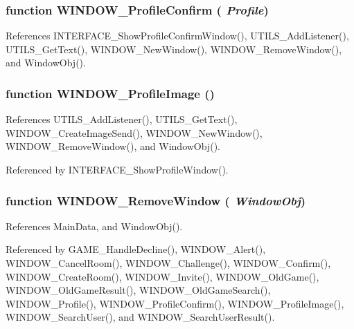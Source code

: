 \subsubsection{\setlength{\rightskip}{0pt plus 5cm}function WINDOW\_\-ProfileConfirm ( {\em Profile})}\label{window_2window_8js_4372845882cf8427672379e1e923adef}




References INTERFACE\_\-ShowProfileConfirmWindow(), UTILS\_\-AddListener(), UTILS\_\-GetText(), WINDOW\_\-NewWindow(), WINDOW\_\-RemoveWindow(), and WindowObj().
\subsubsection{\setlength{\rightskip}{0pt plus 5cm}function WINDOW\_\-ProfileImage ()}\label{window_2window_8js_1c42b15fa0a4e852e46304ee51b506a8}




References UTILS\_\-AddListener(), UTILS\_\-GetText(), WINDOW\_\-CreateImageSend(), WINDOW\_\-NewWindow(), WINDOW\_\-RemoveWindow(), and WindowObj().

Referenced by INTERFACE\_\-ShowProfileWindow().
\subsubsection{\setlength{\rightskip}{0pt plus 5cm}function WINDOW\_\-RemoveWindow ( {\em WindowObj})}\label{window_2window_8js_f8f27008b4a8fe544068dc7db513ce47}




References MainData, and WindowObj().

Referenced by GAME\_\-HandleDecline(), WINDOW\_\-Alert(), WINDOW\_\-CancelRoom(), WINDOW\_\-Challenge(), WINDOW\_\-Confirm(), WINDOW\_\-CreateRoom(), WINDOW\_\-Invite(), WINDOW\_\-OldGame(), WINDOW\_\-OldGameResult(), WINDOW\_\-OldGameSearch(), WINDOW\_\-Profile(), WINDOW\_\-ProfileConfirm(), WINDOW\_\-ProfileImage(), WINDOW\_\-SearchUser(), and WINDOW\_\-SearchUserResult().
